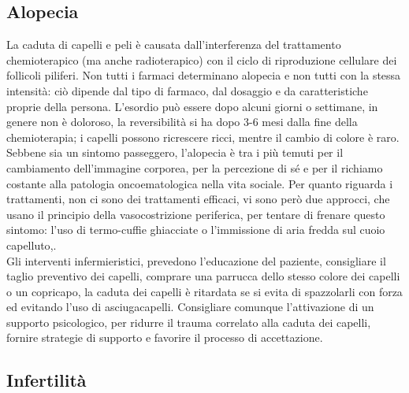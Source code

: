 \subsection{Alopecia}

La caduta di capelli e peli è causata dall’interferenza del trattamento chemioterapico (ma anche radioterapico) con 
il ciclo di riproduzione cellulare dei follicoli piliferi. Non tutti i farmaci determinano alopecia e non tutti con 
la stessa intensità: ciò dipende dal tipo di farmaco, dal dosaggio e da caratteristiche proprie della persona. 
L’esordio può essere dopo alcuni giorni o settimane, in genere non è doloroso, la reversibilità si ha dopo 3-6 mesi 
dalla fine della chemioterapia; i capelli possono ricrescere ricci, mentre il cambio di colore è raro.\\ 
Sebbene sia un sintomo passeggero, l’alopecia è tra i più temuti per il cambiamento dell’immagine corporea, 
per la percezione di sé e per il richiamo costante alla patologia oncoematologica nella vita sociale\cite{HAIRLOSS2}. 
Per quanto riguarda i trattamenti, non ci sono dei trattamenti efficaci, vi sono però due approcci, che usano il 
principio della vasocostrizione periferica, per tentare di frenare questo sintomo:
l’uso di termo-cuffie ghiacciate o l’immissione di aria fredda sul cuoio capelluto\cite{ALOPECIA},\cite{HAIRLOSS}.\\
Gli interventi infermieristici, prevedono l’educazione del paziente, consigliare il taglio preventivo dei capelli, 
comprare una parrucca dello stesso colore dei capelli o un copricapo, la caduta dei capelli è ritardata se si evita 
di spazzolarli con forza ed evitando l’uso di asciugacapelli. Consigliare comunque l’attivazione di un supporto 
psicologico, per ridurre il trauma correlato alla caduta dei capelli, fornire strategie di supporto e favorire 
il processo di accettazione\cite{ALOPECIA}. 

\subsection{Infertilità}

